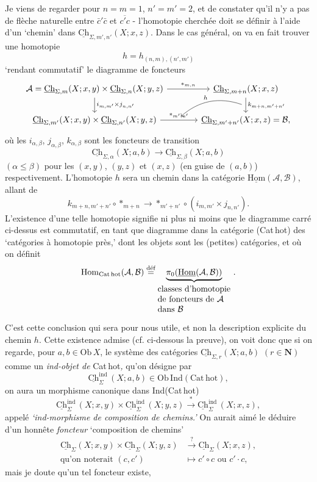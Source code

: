 \documentclass[11pt]{article}
\newcommand{\printedpage}[1]{\marginpar{\footnotesize p.~#1}}
\newcommand{\msp}[1]{\marginpar{\footnotesize [#1]}}
\newcommand{\uHom}{\underline{\mathrm{Hom}}}
\newcommand{\Hom}{\mathrm{Hom}}
\newcommand{\uCh}{\underline{\mathrm{Ch}}}
\begin{document}
Je viens de regarder pour $n=m=1$, $n'=m'=2$, et de constater qu'il n'y a pas de flèche naturelle entre $\bar{c}'\bar{c}$ et $\overline{c'c}$ - l'homotopie cherchée doit
\printedpage{8}
\msp{page 11}
se définir à l'aide d'un `chemin' dans $\uCh_{\Sigma,m',n'}(X;x,z)$. Dans le cas général, on va en fait trouver une homotopie
\[
h=h_{(n,m),(n',m')}
\]
`rendant commutatif' le diagramme de foncteurs
\[
\begin{tikzcd}[column sep=large]
\mathcal{A}=\uCh_{\Sigma,m}(X;x,y)\times\uCh_{\Sigma,n}(X;y,z) \arrow[r, "*_{m,n}"] \arrow[d, "i_{m,m'}\times j_{n,n'}"] & \uCh_{\Sigma,m+n}(X;x,z) \arrow[d, "k_{m+n,m'+n'}", ""'{name=K}] \\
\uCh_{\Sigma,m'}(X;x,y)\times\uCh_{\Sigma,n'}(X;y,z) \arrow[r, "*_{m',n'}", ""{name=S}] & \uCh_{\Sigma,m'+n'}(X;x,z)=\mathcal{B},
\arrow[from=K, to=S, bend right, "h"']
\end{tikzcd}
\]
où les $i_{\alpha,\beta}$, $j_{\alpha,\beta}$, $k_{\alpha,\beta}$ sont les foncteurs de transition
\[
\uCh_{\Sigma,\alpha}(X;a,b)\longrightarrow\uCh_{\Sigma,\beta}(X;a,b)
\]
$(\alpha\leq\beta)$ pour les $(x,y)$, $(y,z)$ et $(x,z)$ (en guise de $(a,b)$) respectivement. L'homotopie $h$ sera un chemin dans la catégorie $\uHom(\mathcal{A},\mathcal{B})$, allant de
\[
k_{m+n,m'+n'}\circ{*}_{m+n}\longrightarrow{*}_{m'+n'}\circ(i_{m,m'}\times j_{n,n'}).
\]
L'existence d'une telle homotopie signifie ni plus ni moins que le diagramme carré ci-dessus est commutatif, en tant que diagramme dans la catégorie (Cat\,hot) des `catégories à homotopie près,' dont les objets sont
\msp{page 12}
les (petites) catégories, et où on définit
\[
\Hom_{\mathrm{Cat\,hot}}(\mathcal{A},\mathcal{B})\overset{\text{déf}}{=}\underbrace{\pi_0(\uHom(\mathcal{A},\mathcal{B}))}_{\begin{array}{@{}l@{}}\text{classes d'homotopie}\\ \text{de foncteurs de }\mathcal{A}\\ \text{dans }\mathcal{B}\end{array}}\,.
\]
C'est cette conclusion qui sera pour nous utile, et non la description explicite du chemin $h$. Cette existence admise (cf. ci-dessous la preuve), on voit donc que si on regarde, pour $a,b\in\mathrm{Ob}\,X$, le système des catégories $\uCh_{\Sigma,r}(X;a,b)$ $(r\in\mathbf{N})$ comme un \textit{ind-objet de} Cat\,hot\textit{,} qu'on désigne par
\[
\uCh^{\mathrm{ind}}_{\Sigma}\,(X;a,b)\in\mathrm{Ob}\,\mathrm{Ind}(\mathrm{Cat\,hot}),
\]
on aura un morphisme canonique dans Ind(Cat\,hot)
\[
\uCh^{\mathrm{ind}}_{\Sigma}\,(X;x,y)\times\uCh^{\mathrm{ind}}_{\Sigma}\,(X;y,z)\xrightarrow{\ *\ }\uCh^{\mathrm{ind}}_{\Sigma}\,(X;x,z),
\]
appelé \textit{`ind-morphisme de composition de chemins.'} On aurait aimé le déduire d'un honnête \textit{foncteur} `composition de chemins'
\[
\begin{aligned}
\uCh_\Sigma(X;x,y)\times\uCh_\Sigma(X;y,z) &\xrightarrow{\ ?\ } \uCh_\Sigma(X;x,z),\\
\text{qu'on noterait }(c,c') &\longmapsto c'\circ c\text{ ou }c'\cdot c,
\end{aligned}
\]
mais je doute qu'un tel foncteur existe,
\end{document}
